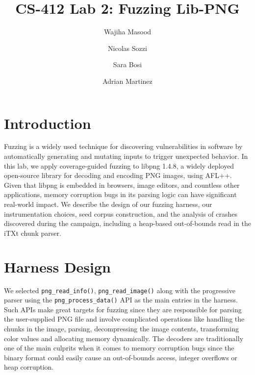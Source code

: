 \documentclass[letterpaper,twocolumn,10pt]{article}
\begin{document}
\date{}

\title{\Large \bf CS-412 Lab 2: Fuzzing Lib-PNG }

\author{
{\rm Wajiha Masood}\\
\and
{\rm Nicolas Sozzi}\\
\and
{\rm Sara Bosi}\\
\and
{\rm Adrian Martinez}
}

\maketitle

\thispagestyle{empty}

\section*{Introduction}
Fuzzing is a widely used technique for discovering vulnerabilities in software by automatically generating and mutating inputs to trigger unexpected behavior. In this lab, we apply coverage-guided fuzzing to libpng 1.4.8, a widely deployed open-source library for decoding and encoding PNG images, using AFL++. Given that libpng is embedded in browsers, image editors, and countless other applications, memory corruption bugs in its parsing logic can have significant real-world impact. We describe the design of our fuzzing harness, our instrumentation choices, seed corpus construction, and the analysis of crashes discovered during the campaign, including a heap-based out-of-bounds read in the iTXt chunk parser.

\section {Harness Design}
We selected \texttt{png\_read\_info()}, \texttt{png\_read\_image()} along with the progressive parser using the
\texttt{png\_process\_data()} API as the main entries in the harness. Such APIs make great targets for fuzzing since they are responsible for parsing the user-supplied PNG file and involve complicated operations like handling the chunks in the image, parsing, decompressing the image contents, transforming color values and allocating memory dynamically. The decoders are traditionally one of the main culprits when it comes to memory corruption bugs since the binary format could easily cause an out-of-bounds access, integer overflows or heap corruption.
\end{document}
